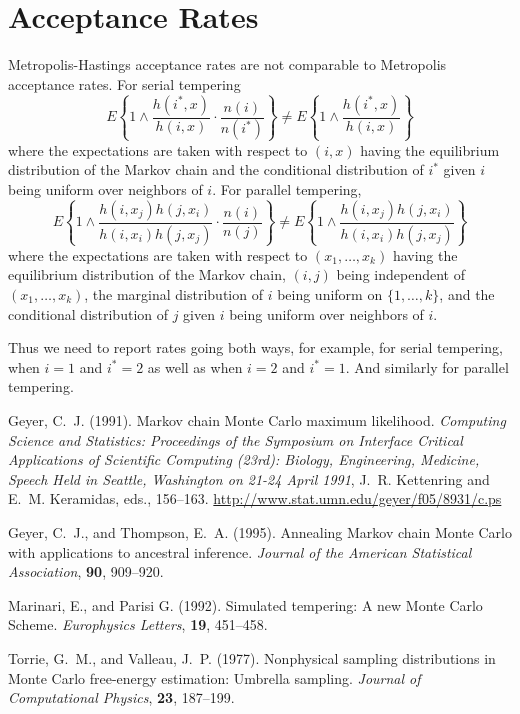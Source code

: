 \documentclass[11pt]{article}
\begin{document}
\section{Acceptance Rates}

Metropolis-Hastings acceptance rates are not comparable
to Metropolis acceptance rates.  For serial tempering
$$
   E \left\{ 1 \wedge
   \frac{h(i^*, x)}{h(i, x)} \cdot
   \frac{n(i)}{n(i^*)}
   \right\}
   \neq
   E \left\{ 1 \wedge
   \frac{h(i^*, x)}{h(i, x)}
   \right\}
$$
where the expectations are taken with respect to $(i, x)$ having
the equilibrium distribution of the Markov chain and
the conditional distribution of $i^*$ given $i$ being uniform over neighbors
of $i$.
For parallel tempering,
$$
   E \left\{ 1 \wedge
   \frac{h(i, x_j) h(j, x_i)}{h(i, x_i) h(j, x_j)} \cdot
   \frac{n(i)}{n(j)}
   \right\}
   \neq
   E \left\{ 1 \wedge
   \frac{h(i, x_j) h(j, x_i)}{h(i, x_i) h(j, x_j)}
   \right\}
$$
where the expectations are taken with respect to $(x_1, \ldots, x_k)$ having
the equilibrium distribution of the Markov chain, $(i, j)$ being independent
of $(x_1, \ldots, x_k)$, the marginal distribution of $i$ being uniform on
$\{ 1, \ldots, k \}$, and the conditional distribution of $j$ given $i$ being
uniform over neighbors of $i$.

Thus we need to report rates going both ways, for example,
for serial tempering, when $i = 1$ and $i^* = 2$
as well as when $i = 2$ and $i^* = 1$.
And similarly for parallel tempering.

\begin{thebibliography}{}

Geyer, C.~J. (1991).
\newblock Markov chain Monte Carlo maximum likelihood.
\newblock \emph{Computing Science and Statistics: Proceedings of the Symposium
    on Interface Critical Applications of Scientific Computing (23rd): Biology,
    Engineering, Medicine, Speech Held in Seattle, Washington on 21-24 April
    1991}, J.~R. Kettenring and E.~M. Keramidas, eds., 156--163.
\newblock \url{http://www.stat.umn.edu/geyer/f05/8931/c.ps}

Geyer, C.~J., and Thompson, E.~A. (1995).
\newblock Annealing Markov chain Monte Carlo with applications to ancestral
    inference.
\newblock \emph{Journal of the American Statistical Association}, \textbf{90},
    909--920.

Marinari, E., and Parisi G. (1992).
\newblock Simulated tempering: A new Monte Carlo Scheme.
\newblock \emph{Europhysics Letters}, \textbf{19}, 451--458.

Torrie, G.~M., and Valleau, J.~P. (1977).
\newblock Nonphysical sampling distributions in Monte Carlo free-energy
  estimation: Umbrella sampling.
\newblock \emph{Journal of Computational Physics}, \textbf{23}, 187--199.

\end{thebibliography}
\end{document}
